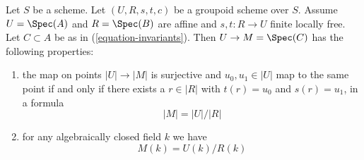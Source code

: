 \begin{lemma}
\label{lemma-points}
Let $S$ be a scheme. Let $(U, R, s, t, c)$ be a groupoid scheme over $S$.
Assume $U = \Spec(A)$ and $R = \Spec(B)$ are affine and
$s, t : R \to U$ finite locally free. Let $C \subset A$ be as in
(\ref{equation-invariants}). Then $U \to M = \Spec(C)$ has
the following properties:
\begin{enumerate}
\item the map on points $|U| \to |M|$ is surjective and
$u_0, u_1 \in |U|$ map to the same point if and only if
there exists a $r \in |R|$ with $t(r) = u_0$ and $s(r) = u_1$, in
a formula
$$
|M| = |U|/|R|
$$
\item for any algebraically closed field $k$ we have
$$
M(k) = U(k)/R(k)
$$
\end{enumerate}
\end{lemma}

